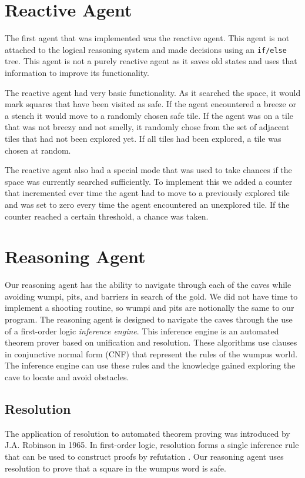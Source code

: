 \documentclass{article}
\begin{document}
\section{Reactive Agent}
The first agent that was implemented was the reactive agent.
 This agent is not attached to the logical reasoning system and made decisions using an \texttt{if/else} tree.
  This agent is not a purely reactive agent as it saves old states and uses that information to improve its functionality\cite{reactive}.
  

The reactive agent had very basic functionality.
 As it searched the space, it would mark squares that have been visited as safe.
  If the agent encountered a breeze or a stench it would move to a randomly chosen safe tile.
   If the agent was on a tile that was not breezy and not smelly, it randomly chose from the set of adjacent tiles that had not been explored yet.
    If all tiles had been explored, a tile was chosen at random.

The reactive agent also had a special mode that was used to take chances if the space was currently searched sufficiently.
 To implement this we added a counter that incremented ever time the agent had to move to a previously explored tile and was set to zero every time the agent encountered an unexplored tile.
  If the counter reached a certain threshold, a chance was taken.

\section{Reasoning Agent}
Our reasoning agent has the ability to navigate through each of the caves while avoiding wumpi, pits, and barriers in search of the gold. We did not have time to implement a shooting routine, so wumpi and pits are notionally the same to our program. The reasoning agent is designed to navigate the caves through the use of a first-order logic \textit{inference engine}. This inference engine is an automated theorem prover based on unification and resolution. These algorithms use clauses in conjunctive normal form (CNF) that represent the rules of the wumpus world. The inference engine can use these rules and the knowledge gained exploring the cave to locate and avoid obstacles.

\subsection{Resolution}
The application of resolution to automated theorem proving was introduced by J.A. Robinson in 1965.
In first-order logic, resolution forms a single inference rule that can be used to construct proofs by refutation \cite{robinson}. 
Our reasoning agent uses resolution to prove that a square in the wumpus word is safe.
\end{document}

